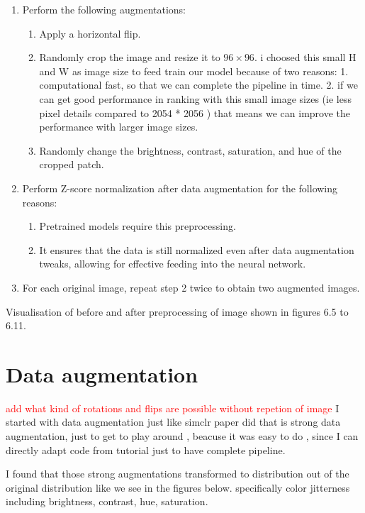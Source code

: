 \begin{enumerate}
  \item Perform the following augmentations:
  \begin{enumerate}
      \item Apply a horizontal flip.
      \item Randomly crop the image and resize it to $96 \times 96$. i choosed this small H and W as image size to feed train our model because of two reasons: 1. 
      computational fast, so that we can complete the pipeline in time. 2. if we can get good performance in ranking with this small image sizes (ie less pixel details
       compared to 2054 * 2056 ) that means we can improve the performance with larger image sizes.
      \item Randomly change the brightness, contrast, saturation, and hue of the cropped patch.
  \end{enumerate}

  \item Perform Z-score normalization after data augmentation for the following reasons:
  \begin{enumerate}
      \item Pretrained models require this preprocessing.
      \item It ensures that the data is still normalized even after data augmentation tweaks, allowing for effective feeding into the neural network.
  \end{enumerate}

  \item For each original image, repeat step 2 twice to obtain two augmented images.
\end{enumerate}


Visualisation of before and after preprocessing of image shown in figures 6.5 to 6.11.

\section{Data augmentation} \label{sec:data augmentation}
\textcolor{red}{add what kind of rotations and flips are possible without repetion of image} 
I started with data augmentation just like simclr paper did that is strong data augmentation, just to get 
to play around , beacuse it was easy to do , since I can directly adapt code 
from tutorial just to have complete pipeline.

I found that those strong augmentations transformed to distribution out of 
the original distribution like we see in the figures below. specifically color jitterness including brightness, 
contrast, hue, saturation.

